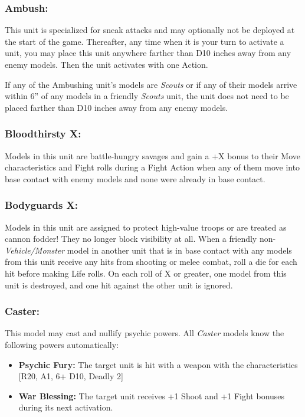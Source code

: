 \begin{multicols}{2}
\subsubsection*{Ambush:} This unit is specialized for sneak attacks and may optionally not be deployed at the start of the game. Thereafter, any time when it is your turn to activate a unit, you may place this unit anywhere farther than D10 inches away from any enemy models. Then the unit activates with one Action.

If any of the Ambushing unit's models are \textit{Scouts} or if any of their models arrive within 6'' of any models in a friendly \textit{Scouts} unit, the unit does not need to be placed farther than D10 inches away from any enemy models.

\subsubsection*{Bloodthirsty X:} Models in this unit are battle-hungry savages and gain a +X bonus to their Move characteristics and Fight rolls during a Fight Action when any of them move into base contact with enemy models and none were already in base contact.

\subsubsection*{Bodyguards X:} Models in this unit are assigned to protect high-value troops or are treated as cannon fodder! They no longer block visibility at all. When a friendly non-\textit{Vehicle/Monster} model in another unit that is in base contact with any models from this unit receive any hits from shooting or melee combat, roll a die for each hit before making Life rolls. On each roll of X or greater, one model from this unit is destroyed, and one hit against the other unit is ignored.

\subsubsection*{Caster:} This model may cast and nullify psychic powers. All \textit{Caster} models know the following powers automatically:

\begin{itemize}
    \item \textbf{Psychic Fury:} The target unit is hit with a weapon with the characteristics [R20, A1, 6+ D10, Deadly 2]
    \item \textbf{War Blessing:} The target unit receives +1 Shoot and +1 Fight bonuses during its next activation.
\end{itemize}


\end{multicols}
